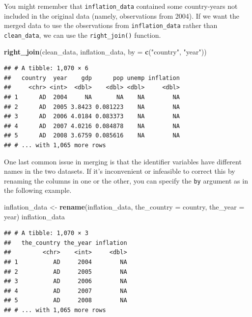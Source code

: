\documentclass[12pt,oneside,openany]{book}
\newenvironment{Shaded}{\begin{snugshade}}{\end{snugshade}}
\newcommand{\KeywordTok}[1]{\textcolor[rgb]{0.13,0.29,0.53}{\textbf{#1}}}
\newcommand{\DataTypeTok}[1]{\textcolor[rgb]{0.13,0.29,0.53}{#1}}
\newcommand{\StringTok}[1]{\textcolor[rgb]{0.31,0.60,0.02}{#1}}
\newcommand{\NormalTok}[1]{#1}
\begin{document}
You might remember that \texttt{inflation\_data} contained some
country-years not included in the original data (namely, observations
from 2004). If we want the merged data to use the observations from
\texttt{inflation\_data} rather than \texttt{clean\_data}, we can use
the \texttt{right\_join()} function.

\begin{Shaded}
\begin{Highlighting}[]
\KeywordTok{right_join}\NormalTok{(clean_data,}
\NormalTok{           inflation_data,}
           \DataTypeTok{by =} \KeywordTok{c}\NormalTok{(}\StringTok{"country"}\NormalTok{, }\StringTok{"year"}\NormalTok{))}
\end{Highlighting}
\end{Shaded}

\begin{verbatim}
## # A tibble: 1,070 × 6
##   country  year    gdp      pop unemp inflation
##     <chr> <int>  <dbl>    <dbl> <dbl>     <dbl>
## 1      AD  2004     NA       NA    NA        NA
## 2      AD  2005 3.8423 0.081223    NA        NA
## 3      AD  2006 4.0184 0.083373    NA        NA
## 4      AD  2007 4.0216 0.084878    NA        NA
## 5      AD  2008 3.6759 0.085616    NA        NA
## # ... with 1,065 more rows
\end{verbatim}

One last common issue in merging is that the identifier variables have
different names in the two datasets. If it's inconvenient or infeasible
to correct this by renaming the columns in one or the other, you can
specify the \texttt{by} argument as in the following example.

\begin{Shaded}
\begin{Highlighting}[]
\NormalTok{inflation_data <-}\StringTok{ }\KeywordTok{rename}\NormalTok{(inflation_data,}
                         \DataTypeTok{the_country =}\NormalTok{ country,}
                         \DataTypeTok{the_year =}\NormalTok{ year)}
\NormalTok{inflation_data}
\end{Highlighting}
\end{Shaded}

\begin{verbatim}
## # A tibble: 1,070 × 3
##   the_country the_year inflation
##         <chr>    <int>     <dbl>
## 1          AD     2004        NA
## 2          AD     2005        NA
## 3          AD     2006        NA
## 4          AD     2007        NA
## 5          AD     2008        NA
## # ... with 1,065 more rows
\end{verbatim}
\end{document}
